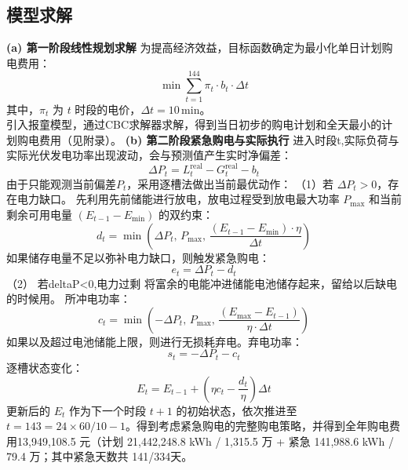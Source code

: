 \documentclass{cumcmthesis}
\begin{document}
    \subsection{模型求解}
    \textbf{(a) 第一阶段线性规划求解} \newline  \hspace*{2em}
为提高经济效益，目标函数确定为最小化单日计划购电费用：
\[
\min \sum_{t=1}^{144} \pi_t \cdot b_t \cdot \Delta t
\] 其中，$\pi_t$ 为 $t$ 时段的电价，$\Delta t=10\,\text{min}$。\\
\hspace*{2em}
引入报童模型，通过CBC求解器求解，得到当日初步的购电计划和全天最小的计划购电费用（见附录）。\newline  \hspace*{2em}
\textbf{(b) 第二阶段紧急购电与实际执行} \newline  \hspace*{2em}
进入时段t,实际负荷与实际光伏发电功率出现波动，会与预测值产生实时净偏差：
\[
\Delta P_t = L_t^{\text{real}} - G_t^{\text{real}} - b_t
\]
由于只能观测当前偏差$P_t$，采用逐槽法做出当前最优动作： 
（1）若 $\Delta P_t>0$，存在电力缺口。
先利用先前储能进行放电，放电过程受到放电最大功率 $P_{\max}$ 和当前剩余可用电量 $(E_{t-1}-E_{\min})$ 的双约束：
\[
d_t = \min \left( \Delta P_t,\, P_{\max},\, \frac{(E_{t-1} - E_{\min}) \cdot \eta}{\Delta t} \right)
\]
如果储存电量不足以弥补电力缺口，则触发紧急购电：
\[
e_t = \Delta P_t - d_t
\]
（2）	若deltaP<0,电力过剩
将富余的电能冲进储能电池储存起来，留给以后缺电的时候用。
所冲电功率：
\[
c_t = \min \left( -\Delta P_t,\, P_{\max},\, \frac{(E_{\max} - E_{t-1})}{\eta \cdot \Delta t} \right)
\]
如果以及超过电池储能上限，则进行无损耗弃电。弃电功率：
\[
s_t = -\Delta P_t - c_t
\]
逐槽状态变化：
\[
E_t = E_{t-1} + \left( \eta c_t - \frac{d_t}{\eta} \right) \Delta t
\]
更新后的 $E_t$ 作为下一个时段 $t+1$ 的初始状态，依次推进至 $t=143=24\times60/10-1$。得到考虑紧急购电的完整购电策略，并得到全年购电费用13,949,108.5 元（计划 21,442,248.8 kWh / 1,315.5 万 + 紧急 141,988.6 kWh / 79.4 万；其中紧急天数共 141/334天。
\end{document}
